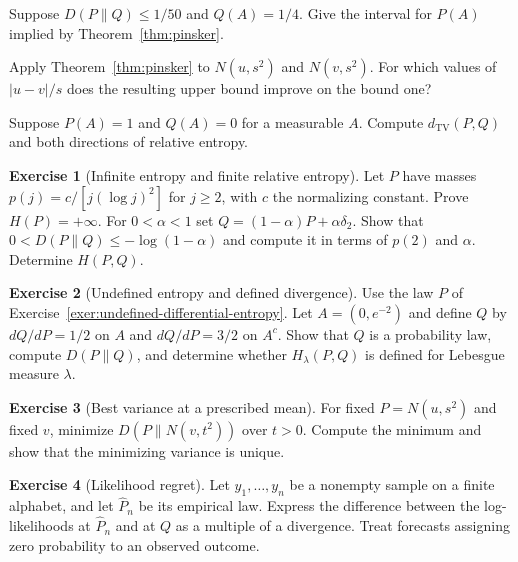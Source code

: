 \documentclass[11pt,oneside]{book}
\theoremstyle{definition}
\newtheorem{exercise}{Exercise}[section]
\theoremstyle{remark}
\begin{document}
\begin{practiceexercise}
\label{pex:pinsker-event-bound}
Suppose $D(P\|Q)\leq 1/50$ and $Q(A)=1/4$. Give the interval
for $P(A)$ implied by Theorem~\ref{thm:pinsker}.
\end{practiceexercise}

\begin{practiceexercise}
\label{pex:pinsker-normal-mean-shift}
Apply Theorem~\ref{thm:pinsker} to $N(u,s^2)$ and $N(v,s^2)$.
For which values of $|u-v|/s$ does the resulting upper bound
improve on the bound one?
\end{practiceexercise}

\begin{practiceexercise}
\label{pex:disjoint-relative-entropy-tv}
Suppose $P(A)=1$ and $Q(A)=0$ for a measurable $A$.
Compute $d_{\mathrm{TV}}(P,Q)$ and both directions of relative entropy.
\end{practiceexercise}

\begin{exercise}[Infinite entropy and finite relative entropy]
\label{exer:relative-entropy-infinite-entropy}
Let $P$ have masses $p(j)=c/[j(\log j)^2]$ for $j\geq2$, with
$c$ the normalizing constant. Prove $H(P)=+\infty$. For
$0<\alpha<1$ set $Q=(1-\alpha)P+\alpha\delta_2$. Show that
$0<D(P\|Q)\leq-\log(1-\alpha)$ and compute it in terms of
$p(2)$ and $\alpha$. Determine $H(P,Q)$.
\end{exercise}

\begin{exercise}[Undefined entropy and defined divergence]
\label{exer:relative-entropy-undefined-entropy}
Use the law $P$ of Exercise~\ref{exer:undefined-differential-entropy}.
Let $A=(0,e^{-2})$ and define $Q$ by $dQ/dP=1/2$ on $A$ and
$dQ/dP=3/2$ on $A^c$. Show that $Q$ is a probability law, compute
$D(P\|Q)$, and determine whether $H_\lambda(P,Q)$ is defined
for Lebesgue measure $\lambda$.
\end{exercise}

\begin{exercise}[Best variance at a prescribed mean]
\label{exer:relative-entropy-normal-variance}
For fixed $P=N(u,s^2)$ and fixed $v$, minimize
$D(P\|N(v,t^2))$ over $t>0$. Compute the minimum and show
that the minimizing variance is unique.
\end{exercise}

\begin{exercise}[Likelihood regret]
\label{exer:relative-entropy-likelihood-regret}
Let $y_1,\ldots,y_n$ be a nonempty sample on a finite alphabet,
and let $\widehat P_n$ be its empirical law. Express the difference
between the log-likelihoods at $\widehat P_n$ and at $Q$ as a
multiple of a divergence. Treat forecasts assigning zero
probability to an observed outcome.
\end{exercise}
\end{document}
